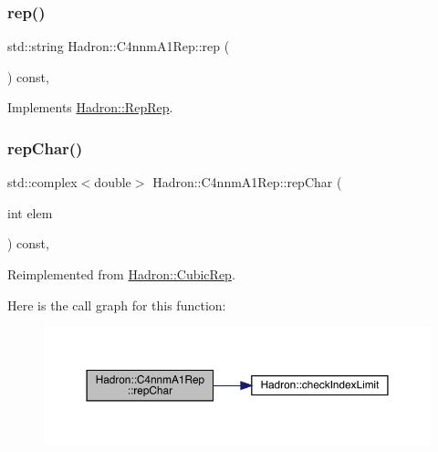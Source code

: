 \subsubsection{\texorpdfstring{rep()}{rep()}\hspace{0.1cm}{\footnotesize\ttfamily [5/5]}}
{\footnotesize\ttfamily std\+::string Hadron\+::\+C4nnm\+A1\+Rep\+::rep (\begin{DoxyParamCaption}{ }\end{DoxyParamCaption}) const\hspace{0.3cm}{\ttfamily [inline]}, {\ttfamily [virtual]}}



Implements \mbox{\hyperlink{structHadron_1_1RepRep_ab3213025f6de249f7095892109575fde}{Hadron\+::\+Rep\+Rep}}.

\mbox{\label{structHadron_1_1C4nnmA1Rep_a369d43e2f70764875daf2967ab976dad}} 
\subsubsection{\texorpdfstring{repChar()}{repChar()}\hspace{0.1cm}{\footnotesize\ttfamily [1/3]}}
{\footnotesize\ttfamily std\+::complex$<$double$>$ Hadron\+::\+C4nnm\+A1\+Rep\+::rep\+Char (\begin{DoxyParamCaption}\item[{int}]{elem }\end{DoxyParamCaption}) const\hspace{0.3cm}{\ttfamily [inline]}, {\ttfamily [virtual]}}



Reimplemented from \mbox{\hyperlink{structHadron_1_1CubicRep_af45227106e8e715e84b0af69cd3b36f8}{Hadron\+::\+Cubic\+Rep}}.

Here is the call graph for this function\+:
\nopagebreak
\begin{figure}[H]
\begin{center}
\leavevmode
\includegraphics[width=350pt]{d4/dbc/structHadron_1_1C4nnmA1Rep_a369d43e2f70764875daf2967ab976dad_cgraph}
\end{center}
\end{figure}
\mbox{\label{structHadron_1_1C4nnmA1Rep_a369d43e2f70764875daf2967ab976dad}} 
